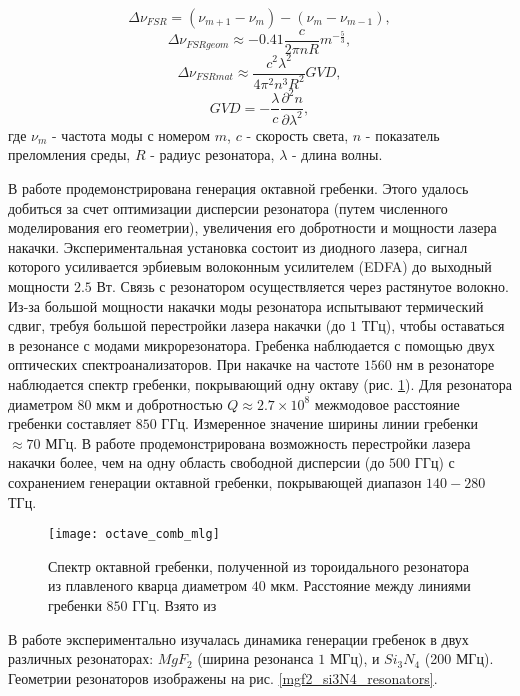 \begin{equation}
\Delta\nu_{FSR}=(\nu_{m+1}-\nu_m)-(\nu_m-\nu_{m-1}),
\end{equation}
\begin{equation}
\Delta\nu_{FSRgeom}\approx-0.41\frac{c}{2\pi nR}m^{-\frac{5}{3}},
\end{equation}
\begin{equation}
\Delta\nu_{FSRmat}\approx\frac{c^2\lambda^2}{4\pi^2n^3R^2}GVD,
\end{equation}
\begin{equation}
GVD=-\frac{\lambda}{c}\frac{\partial^2 n}{\partial \lambda^2},
\end{equation}
где $\nu_m$ - частота моды с номером $m$, $c$ - скорость света, $n$ - показатель преломления среды, $R$ - радиус резонатора, $\lambda$ - длина волны.

В работе \cite{DelHaye2011} продемонстрирована генерация октавной гребенки. Этого удалось добиться за счет оптимизации дисперсии резонатора (путем численного моделирования его геометрии), увеличения его добротности и мощности лазера накачки. Экспериментальная установка состоит из диодного лазера, сигнал которого усиливается эрбиевым волоконным усилителем (EDFA) до выходный мощности $2.5$ Вт. Связь с резонатором осуществляется через растянутое волокно. Из-за большой мощности накачки моды резонатора испытывают термический сдвиг, требуя большой перестройки лазера накачки (до $1$ ТГц), чтобы оставаться в резонансе с модами микрорезонатора. Гребенка наблюдается с помощью двух оптических спектроанализаторов. При накачке на частоте $1560$ нм в резонаторе наблюдается спектр гребенки, покрывающий одну октаву (рис. \ref{octave_comb_mlg}). Для резонатора диаметром $80$ мкм и добротностью $Q\approx2.7\times10^8$ межмодовое расстояние гребенки составляет $850$ ГГц. Измеренное значение ширины линии гребенки $\approx 70$ МГц. В работе продемонстрирована возможность перестройки лазера накачки более, чем на одну область свободной дисперсии (до $500$ ГГц) с сохранением генерации октавной гребенки, покрывающей диапазон $140-280$ ТГц.
\begin{figure}
  \texttt{[image: octave\_comb\_mlg]}
  \caption{Спектр октавной гребенки, полученной из тороидального резонатора из плавленого кварца диаметром $40$ мкм. Расстояние между линиями гребенки $850$ ГГц. Взято из \cite{DelHaye2011}}
  \label{octave_comb_mlg}
\end{figure}


В работе \cite{Herr2012} экспериментально изучалась динамика генерации гребенок в двух различных резонаторах: $MgF_2$ (ширина резонанса $1$ МГц), и $Si_3N_4$ (200 МГц). Геометрии резонаторов изображены на рис. \ref{mgf2_si3N4_resonators}.

